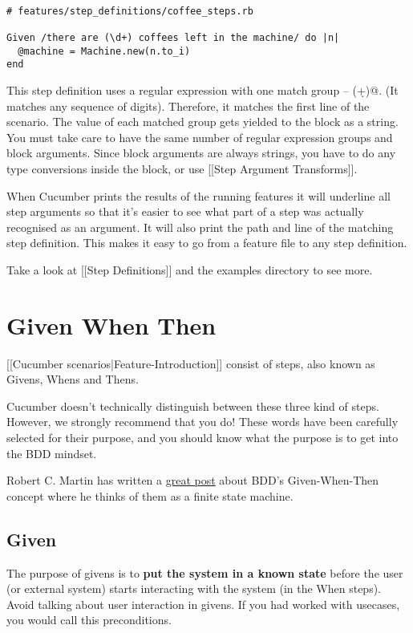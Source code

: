 \documentclass[10pt]{book}
\begin{document}
\begin{verbatim}

# features/step_definitions/coffee_steps.rb

Given /there are (\d+) coffees left in the machine/ do |n|
  @machine = Machine.new(n.to_i)
end

\end{verbatim}
This step definition uses a regular expression with one match group -- \verb@(\d+)@. (It matches any sequence of digits). Therefore, it matches the first line of the scenario. The value of each matched group gets yielded to the block as a string. You must take care to have the same number of regular expression groups and block arguments. Since block arguments are always strings, you have to do any type conversions inside the block, or use [[Step Argument Transforms]].

When Cucumber prints the results of the running features it will underline all step arguments so that it's easier to see what part of a step was actually recognised as an argument. It will also print the path and line of the matching step definition. This makes it easy to go from a feature file to any step definition.

Take a look at [[Step Definitions]] and the examples directory to see more.


\chapter{Given When Then}

[[Cucumber scenarios|Feature-Introduction]] consist of steps, also known as Givens, Whens and Thens.

Cucumber doesn't technically distinguish between these three kind of steps. However, we strongly recommend that you do! These words have been carefully selected for their purpose, and you should know what the purpose is to get into the BDD mindset.

Robert C. Martin has written a \href{https://sites.google.com/site/unclebobconsultingllc/the-truth-about-bdd}{great post} about BDD's Given-When-Then concept where he thinks of them as a finite state machine.

\section{Given}

The purpose of givens is to \textbf{put the system in a known state} before the user (or external system) starts interacting with the system (in the When steps). Avoid talking about user interaction in givens.  If you had worked with usecases, you would call this preconditions.
\end{document}
